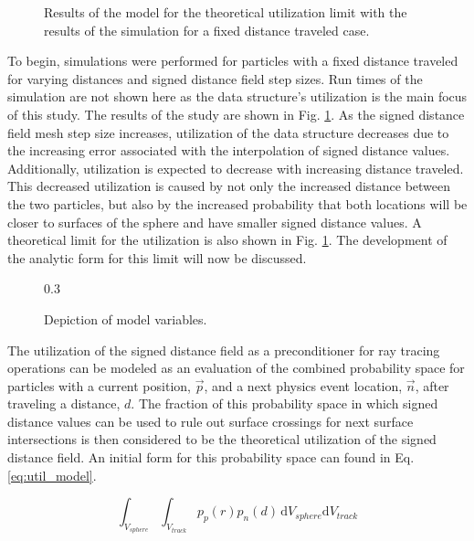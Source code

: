 \begin{figure}[!htb]
  \centering
  {\textwidth}
  \caption{Results of the model for the theoretical utilization limit with the
    results of the simulation for a fixed distance traveled case.}
  \label{fig:sdf_fixed_dist}    
\end{figure}

To begin, simulations were performed for particles with a fixed distance
traveled for varying distances and signed distance field step sizes. Run times
of the simulation are not shown here as the data structure's utilization is the
main focus of this study. The results of the study are shown in
Fig. \ref{fig:sdf_fixed_dist}. As the signed distance field mesh step size
increases, utilization of the data structure decreases due to the increasing
error associated with the interpolation of signed distance values. Additionally,
utilization is expected to decrease with increasing distance traveled. This
decreased utilization is caused by not only the increased distance between the
two particles, but also by the increased probability that both locations will be
closer to surfaces of the sphere and have smaller signed distance values. A
theoretical limit for the utilization is also shown in
Fig. \ref{fig:sdf_fixed_dist}. The development of the analytic form for this
limit will now be discussed.

\begin{figure}[ht]
  \centering
  {0.3\textwidth}
  \caption{Depiction of model variables.}
  \label{fig:model}
\end{figure}

The utilization of the signed distance field as a preconditioner for ray tracing
operations can be modeled as an evaluation of the combined probability space for
particles with a current position, $\vec{p}$, and a next physics event location,
$\vec{n}$, after traveling a distance, $d$. The fraction of this probability
space in which signed distance values can be used to rule out surface crossings
for next surface intersections is then considered to be the theoretical
utilization of the signed distance field. An initial form for this probability
space can found in Eq. \ref{eq:util_model}.

\begin{equation}
  \label{eq:util_model}
\int_{V_{sphere}}\int_{V_{track}} p_p(r) p_n(d) \, \mathrm{d}V_{sphere}\mathrm{d}V_{track}
\end{equation}

